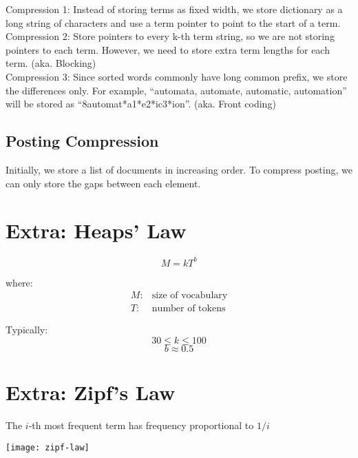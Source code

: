\begin{multicols*}{2}
\noindent Compression 1: Instead of storing terms as fixed width, we store dictionary as a long string of characters and use a term pointer to point to the start of a term.\\

\noindent Compression 2: Store pointers to every k-th term string, so we are not storing pointers to each term. However, we need to store extra term lengths for each term. (aka. Blocking)\\

\noindent Compression 3: Since sorted words commonly have long common prefix, we store the differences only. For example, ``automata, automate, automatic, automation'' will be stored as ``8automat*a1*e2*ic3*ion''. (aka. Front coding)

\subsection{Posting Compression}
Initially, we store a list of documents in increasing order. To compress posting, we can only store the gaps between each element. 

\section{Extra: Heaps’ Law}
$$M=kT^b$$

\noindent where:
\begin{equation*}
\begin{split}
    M: & \text{size of vocabulary} \\
    T: & \text{number of tokens}
\end{split}
\end{equation*}

\noindent Typically: 
$$30 \le k \le 100$$
$$b \approx 0.5$$

\section{Extra: Zipf’s Law}
The $i$-th most frequent term has frequency proportional to $1 / i$
\begin{center}
\texttt{[image: zipf-law]}
\end{center}

\end{multicols*}
